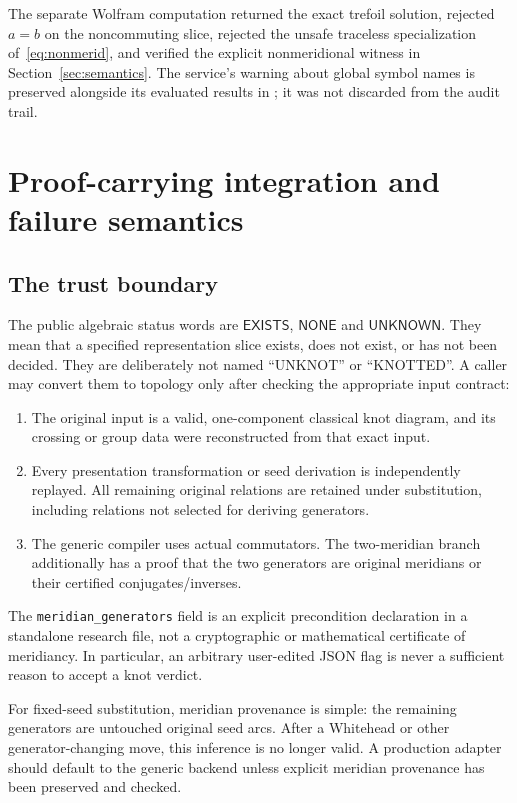 \documentclass[11pt]{article}
\theoremstyle{definition}
\theoremstyle{remark}
\newcommand{\code}[1]{\texttt{#1}}
\newcommand{\EX}{\mathsf{EXISTS}}
\newcommand{\NO}{\mathsf{NONE}}
\newcommand{\UN}{\mathsf{UNKNOWN}}
\begin{document}
The separate Wolfram computation returned the exact trefoil solution, rejected $a=b$ on the noncommuting slice, rejected the unsafe traceless specialization of~\eqref{eq:nonmerid}, and verified the explicit nonmeridional witness in Section~\ref{sec:semantics}. The service's warning about global symbol names is preserved alongside its evaluated results in ; it was not discarded from the audit trail.

\section{Proof-carrying integration and failure semantics}
\label{sec:integration}

\subsection{The trust boundary}
The public algebraic status words are $\EX$, $\NO$ and $\UN$. They mean that a specified representation slice exists, does not exist, or has not been decided. They are deliberately not named ``UNKNOT'' or ``KNOTTED''. A caller may convert them to topology only after checking the appropriate input contract:
\begin{enumerate}
\item The original input is a valid, one-component classical knot diagram, and its crossing or group data were reconstructed from that exact input.
\item Every presentation transformation or seed derivation is independently replayed. All remaining original relations are retained under substitution, including relations not selected for deriving generators.
\item The generic compiler uses actual commutators. The two-meridian branch additionally has a proof that the two generators are original meridians or their certified conjugates/inverses.
\end{enumerate}
The \code{meridian\_generators} field is an explicit precondition declaration in a standalone research file, not a cryptographic or mathematical certificate of meridiancy. In particular, an arbitrary user-edited JSON flag is never a sufficient reason to accept a knot verdict.

For fixed-seed substitution, meridian provenance is simple: the remaining generators are untouched original seed arcs. After a Whitehead or other generator-changing move, this inference is no longer valid. A production adapter should default to the generic backend unless explicit meridian provenance has been preserved and checked.
\end{document}

